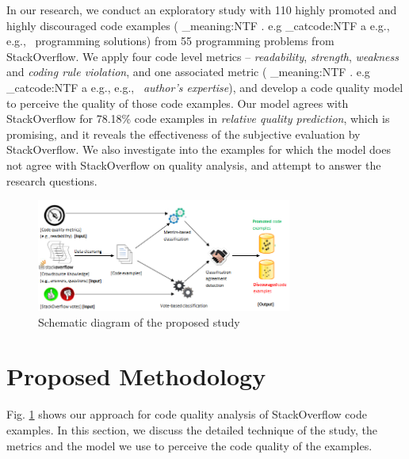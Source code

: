 \documentclass{sig-alternate}
\makeatletter
\newcommand\latinabbrev[1]{
  \peek_meaning:NTF . {%
    #1\@}%
  { \peek_catcode:NTF a {%
      #1., \@ }%
    {#1., \@}}}
\def\eg{\latinabbrev{e.g}}
\makeatother
\begin{document}
In our research, we conduct an exploratory study with 110 highly promoted and highly discouraged code examples (\eg\ programming solutions) from 55 programming problems from StackOverflow. We apply four code level metrics -- \emph{readability}, \emph{strength}, \emph{weakness} and \emph{coding rule violation}, and one associated metric (\eg\ \emph{author's expertise}), and develop a code quality model to perceive the quality of those code examples.  Our model agrees with StackOverflow for 78.18\% code examples in \emph{relative quality prediction}, which is promising, and it reveals the effectiveness of the subjective evaluation by StackOverflow. We also investigate into the examples for which the model does not agree with StackOverflow on quality analysis, and attempt to answer the research questions.
\begin{figure}[!t]
\centering
\includegraphics[width=3.3in]{sysdiag}
\caption{Schematic diagram of the proposed study}
\vspace{-.2cm}
\label{fig:sysdiag}
\end{figure}
\vspace{-.2cm}
\section{Proposed Methodology}
\label{sec:theory}
Fig. \ref{fig:sysdiag} shows our approach for code quality analysis of StackOverflow code examples. In this section, we discuss the detailed technique of the study, the metrics and the model we use to perceive the code quality of the examples.
\end{document}
